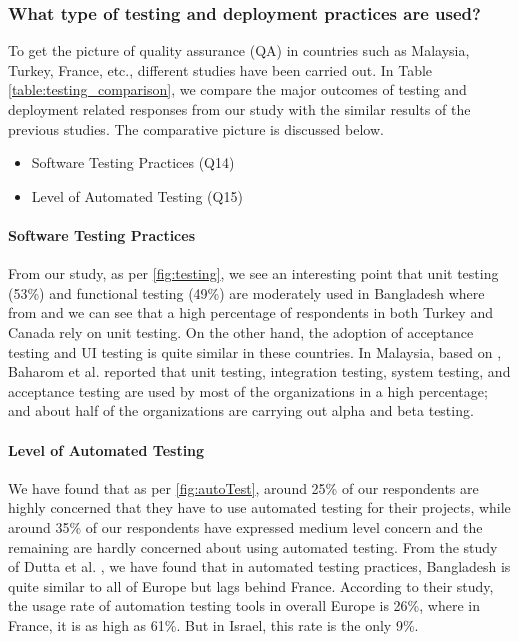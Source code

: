 \subsubsection{What type of testing and deployment practices are used?}

To get the picture of quality assurance (QA) in countries such as Malaysia, Turkey, France, etc., different studies have been carried out. In Table \ref{table:testing_comparison}, we compare the major outcomes of testing and deployment related responses from our study with the similar results of the previous studies. The comparative picture is discussed below.

\begin{itemize}
    \item Software Testing Practices (Q14)
    \item Level of Automated Testing (Q15)
\end{itemize}




\paragraph{Software Testing Practices}
From our study, as per \ref{fig:testing}, we see an interesting point that unit testing (53\%) and functional testing (49\%) are moderately used in Bangladesh where from \cite{Wang2018} and \cite{Garousi2013} we can see that a high percentage of respondents in both Turkey and Canada rely on unit testing. On the other hand, the adoption of acceptance testing and UI testing is quite similar in these countries. In Malaysia, based on \cite{Baharom2006}, Baharom et al. reported that unit testing, integration testing, system testing, and acceptance testing are used by most of the organizations in a high percentage; and about half of the organizations are carrying out alpha and beta testing.



\paragraph{Level of Automated Testing}
We have found that as per \ref{fig:autoTest}, around 25\% of our respondents are highly concerned that they have to use automated testing for their projects,   while around 35\% of our respondents have expressed medium level concern and the remaining are hardly concerned about using automated testing. From the study of Dutta et al. \cite{dutta1999}, we have found that in automated testing practices, Bangladesh is quite similar to all of Europe but lags behind France. According to their study, the usage rate of automation testing tools in overall Europe is 26\%, where in France, it is as high as 61\%. But in Israel, this rate is the only 9\%.
